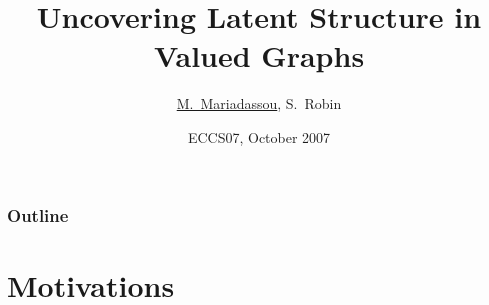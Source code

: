 \documentclass{beamer}
\title[Uncovering Structure in Valued Graphs] %
{Uncovering Latent Structure in Valued Graphs}
\author[Mariadassou] %
{\underline{M.~Mariadassou}, S.~Robin}
\institute[AgroParisTech] %
{
  UMR AgroParisTech/INRA MIA 518, Paris
}
\date[ECCS07] %
{ECCS07, October 2007}
\begin{document}
\begin{frame}
  \titlepage
\end{frame}

\begin{frame}
  \frametitle{Outline}
  \tableofcontents
\end{frame}





\section{Motivations}
\end{document}
